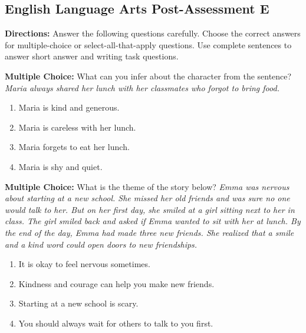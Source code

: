 \documentclass[12pt]{article}
\begin{document}
\subsection*{English Language Arts Post-Assessment E}
\onehalfspacing

\begin{tcolorbox}[colframe=black!50, colback=white, title=Assessment Directions]
\textbf{Directions:} Answer the following questions carefully. Choose the correct answers for multiple-choice or select-all-that-apply questions. Use complete sentences to answer short answer and writing task questions.
\end{tcolorbox}

\begin{tcolorbox}[colframe=black!50, colback=white, title=Question 1]
\textbf{Multiple Choice:} What can you infer about the character from the sentence?  
\textit{Maria always shared her lunch with her classmates who forgot to bring food.}  
\begin{enumerate}[label=(\Alph*)]
\item Maria is kind and generous.
\item Maria is careless with her lunch.
\item Maria forgets to eat her lunch.
\item Maria is shy and quiet.
\end{enumerate}
\end{tcolorbox}

\begin{tcolorbox}[colframe=black!50, colback=white, title=Question 2]
\textbf{Multiple Choice:} What is the theme of the story below?  
\textit{Emma was nervous about starting at a new school. She missed her old friends and was sure no one would talk to her. But on her first day, she smiled at a girl sitting next to her in class. The girl smiled back and asked if Emma wanted to sit with her at lunch. By the end of the day, Emma had made three new friends. She realized that a smile and a kind word could open doors to new friendships.}

\begin{enumerate}[label=(\Alph*)]
\item It is okay to feel nervous sometimes.
\item Kindness and courage can help you make new friends.
\item Starting at a new school is scary.
\item You should always wait for others to talk to you first.
\end{enumerate}
\end{tcolorbox}
\end{document}
